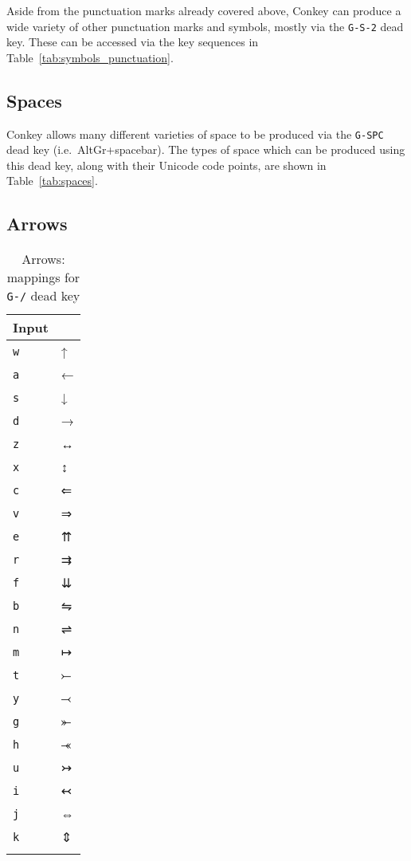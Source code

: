 \documentclass[oneside]{memoir}
\newcommand{\key}{\verb}
\newcommand{\keynv}{\texttt}
\begin{document}
Aside from the punctuation marks already covered above,
  Conkey can produce a wide variety of other punctuation marks and symbols,
  mostly via the \key|G-S-2| dead key.
These can be accessed via the key sequences in Table~\ref{tab:symbols_punctuation}.

\subsection{Spaces}
\label{sec:spaces}

Conkey allows many different varieties of space to be produced via the \key|G-SPC| dead key
  (i.e.\ AltGr+spacebar).
The types of space which can be produced using this dead key,
  along with their Unicode code points,
  are shown in Table~\ref{tab:spaces}.

\subsection{Arrows}
\label{sec:arrows}

\begin{table}
\caption{Arrows: mappings for \keynv{G-/} dead key}
\label{tab:arrows}
\centering
\begin{tabular}{l>{\fallbackfontsymbol}l}
\toprule
Input & \multicolumn{1}{l}{Result} \\
\midrule
\key|w| & ↑ \\
\key|a| & ← \\
\key|s| & ↓ \\
\key|d| & → \\
\key|z| & ↔ \\
\key|x| & ↕ \\
\key|c| & ⇐ \\
\key|v| & ⇒ \\
\key|e| & ⇈ \\
\key|r| & ⇉ \\
\key|f| & ⇊ \\
\key|b| & ⇋ \\
\key|n| & ⇌ \\
\key|m| & ↦ \\
\key|t| & ⤚ \\
\key|y| & ⤙ \\
\key|g| & ⤜ \\
\key|h| & ⤛ \\
\key|u| & ↣ \\
\key|i| & ↢ \\
\key|j| & ⇔ \\
\key|k| & ⇕ \\
\bottomrule&
\end{tabular}
\end{table}
\end{document}
